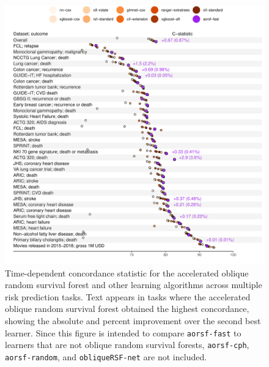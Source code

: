 \documentclass[12pt]{article}\usepackage[]{graphicx}\usepackage[]{xcolor}
\makeatletter
\def\maxwidth{ %
  \ifdim\Gin@nat@width>\linewidth
    \linewidth
  \else
    \Gin@nat@width
  \fi
}
\newenvironment{knitrout}{}{} %
\makeatother
\begin{document}
\begin{knitrout}
\color{fgcolor}\begin{figure}
\includegraphics[width=\maxwidth]{figure/bm_pred_viz_cstat-1} \caption[Time-dependent concordance statistic for the accelerated oblique random survival forest and other learning algorithms across multiple risk prediction tasks]{Time-dependent concordance statistic for the accelerated oblique random survival forest and other learning algorithms across multiple risk prediction tasks. Text appears in tasks where the accelerated oblique random survival forest obtained the highest concordance, showing the absolute and percent improvement over the second best learner. Since this figure is intended to compare \texttt{aorsf-fast} to learners that are not oblique random survival forests, \texttt{aorsf-cph}, \texttt{aorsf-random}, and \texttt{obliqueRSF-net} are not included.}\label{fig:bm_pred_viz_cstat}
\end{figure}

\end{knitrout}
\end{document}
